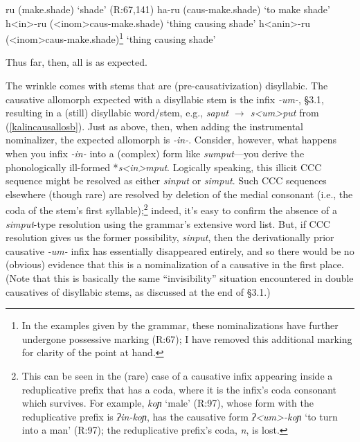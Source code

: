 \documentclass[output=paper,colorlinks,citecolor=brown,
]{langscibook}
\begin{document}
\ea \ea ru (make.shade) \hfill `shade' (R:67,141)
\ex ha-ru ({\sc caus-}make.shade) \hfill `to make shade'
\ex h<in>-ru ({\sc <inom>caus-}make.shade) \hfill `thing causing shade'
\ex h<anin>-ru ({\sc <inom>caus-}make.shade)\footnote{In the examples given by the grammar, these nominalizations have further undergone possessive marking (R:67); I have removed this additional marking for clarity of the point at hand.} \hfill `thing causing shade'
\z
\z

\noindent Thus far, then, all is as expected.

The wrinkle comes with stems that are (pre-causativization) disyllabic. The causative allomorph expected with a disyllabic stem is the infix \textit{-um-}, \S3.1, resulting in a (still) disyllabic word/stem, e.g., \textit{saput $\rightarrow$ s<um>put} from (\ref{kalincausallosb}). Just as above, then, when adding the instrumental nominalizer, the expected allomorph is \textit{-in-}. Consider, however, what happens when you infix \textit{-in-} into a (complex) form like \textit{sumput}---you derive the phonologically ill-formed *\textit{s<in>mput}. Logically speaking, this illicit CCC sequence might be resolved as either \textit{si{np}ut} or \textit{si{mp}ut}. Such CCC sequences elsewhere (though rare) are resolved by deletion of the medial consonant (i.e., the coda of the stem's first syllable);\footnote{This can be seen in the (rare) case of a causative infix appearing inside a reduplicative prefix that has a coda, where it is the infix's coda consonant which survives. For example, \textit{koɲ} `male' (R:97), whose form with the reduplicative prefix is \textit{ʔin-koɲ}, has the causative form \textit{ʔ<um>-koɲ} `to turn into a man' (R:97); the reduplicative prefix's coda, \textit{n}, is lost.\label{kalinCCCfn}} indeed, it's easy to confirm the absence of a \textit{si{mp}ut}-type resolution using the grammar's extensive word list. But, if CCC resolution gives us the former possibility, \textit{sinput}, then the derivationally prior causative \textit{-um-} infix has essentially disappeared entirely, and so there would be no (obvious) evidence that this is a nominalization of a causative in the first place. (Note that this is basically the same ``invisibility'' situation encountered in double causatives of disyllabic stems, as discussed at the end of \S3.1.)

\end{document}
